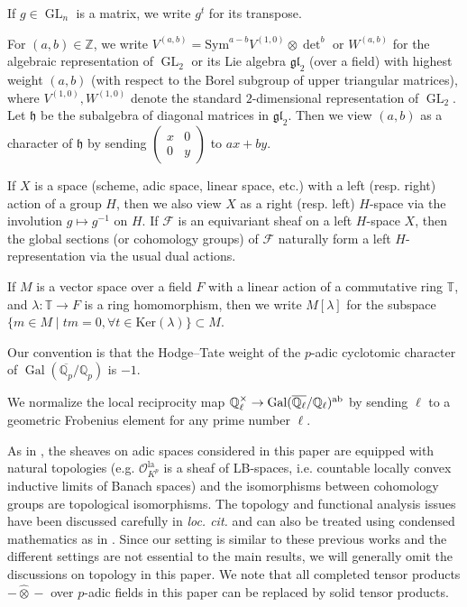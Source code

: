 \documentclass{article}
\theoremstyle{definition}
\def\calF{\mathcal{F}}
\def\calO{\mathcal{O}}
\def\frh{\mathfrak{h}}
\def\bbQ{\mathbb{Q}}
\def\bbT{\mathbb{T}}
\def\bbZ{\mathbb{Z}}
\DeclareMathOperator{\ox}{\otimes}
\DeclareMathOperator{\Gal}{Gal}
\DeclareMathOperator{\GL}{GL}
\def\lan{\mathrm{la}}
\begin{document}
If $g\in\GL_n$ is a matrix, we write $g^t$ for its transpose.

For $(a,b)\in\bbZ$, we write $V^{(a,b)}=\mathrm{Sym}^{a-b}V^{(1,0)}\otimes\det^{b}$ or $W^{(a,b)}$ for the algebraic representation of $\GL_2$ or its Lie algebra $\mathfrak{gl}_2$ (over a field) with highest weight $(a,b)$ (with respect to the Borel subgroup of upper triangular matrices), where $V^{(1,0)},W^{(1,0)}$ denote the standard $2$-dimensional representation of $\GL_2$. Let $\frh$ be the subalgebra of diagonal matrices in $\mathfrak{gl}_2$. Then we view $(a,b)$ as a character of $\frh$ by sending $\begin{pmatrix}x&0\\0&y
\end{pmatrix}$ to $ax+by$.

If $X$ is a space (scheme, adic space, linear space, etc.) with a left (resp. right) action of a group $H$, then we also view $X$ as a right (resp. left) $H$-space via the involution $g\mapsto g^{-1}$ on $H$. If $\calF$ is an equivariant sheaf on a left $H$-space $X$, then the global sections (or cohomology groups) of $\calF$ naturally form a left $H$-representation via the usual dual actions.

If $M$ is a vector space over a field $F$ with a linear action of a commutative ring $\bbT$, and $\lambda:\bbT\rightarrow F$ is a ring homomorphism, then we write $M[\lambda]$ for the subspace $\{m\in M\mid tm=0,\forall t\in \mathrm{Ker}(\lambda) \}\subset M$. 

Our convention is that the Hodge--Tate weight of the $p$-adic cyclotomic character of $\Gal(\overline{\bbQ_p}/\bbQ_p)$ is $-1$.

We normalize the local reciprocity map $\bbQ_{\ell}^{\times}\rightarrow \Gal(\overline{\bbQ_{\ell}}/\bbQ_{\ell})^{\rm ab}$ by sending $\ell$ to a geometric Frobenius element for any prime number $\ell$.

As in \cite{Pan22,PanII}, the sheaves on adic spaces considered in this paper are equipped with natural topologies (e.g. $\calO_{K^p}^{\lan}$ is a sheaf of LB-spaces, i.e. countable locally convex inductive limits of Banach spaces) and the isomorphisms between cohomology groups are topological isomorphisms. The topology and functional analysis issues have been discussed carefully in \textit{loc. cit.} and can also be treated using condensed mathematics as in \cite{camargo2024locallyanalyticcompletedcohomology,boxer2025modularity}. Since our setting is similar to these previous works and the different settings are not essential to the main results, we will generally omit the discussions on topology in this paper. We note that all completed tensor products $-\widehat{\ox}-$ over $p$-adic fields in this paper can be replaced by solid tensor products.
\end{document}
